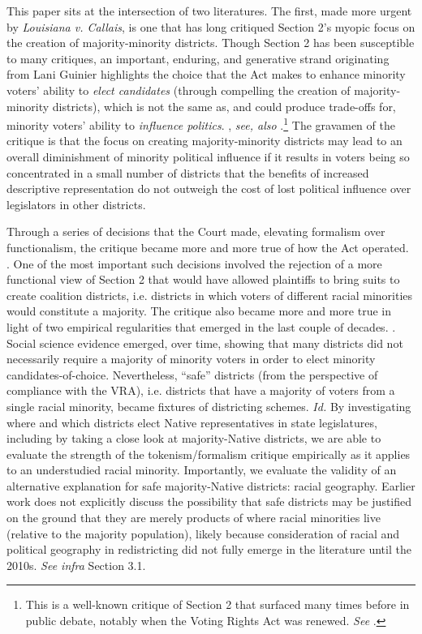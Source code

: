 \documentclass[12pt]{article}
\begin{document}
This paper sits at the intersection of two literatures.  The first, made more urgent by \textit{Louisiana v. Callais}, is one that has long critiqued Section 2's myopic focus on the creation of majority-minority districts. Though Section 2 has been susceptible to many critiques, an important, enduring, and generative strand originating from Lani Guinier highlights the choice that the Act makes to enhance minority voters' ability to \emph{elect candidates} (through compelling the creation of majority-minority districts), which is not the same as, and could produce trade-offs for, minority voters' ability to \emph{influence politics}. \cite{guinier1989keeping,guinier1991triumph,guinier1992representation}, \textit{see, also} \cite{abrams1992relationships,issacharoff2015voting}.\footnote{This is a well-known critique of Section 2 that surfaced many times before in public debate, notably when the Voting Rights Act was renewed.  \textit{See} \cite{persily2007promise}.} The gravamen of the critique is that the focus on creating majority-minority districts may lead to an overall diminishment of minority political influence if it results in voters being so concentrated in a small number of districts that the benefits of increased descriptive representation do not outweigh the cost of lost political influence over legislators in other districts.

Through a series of decisions that the Court made, elevating formalism over functionalism, the critique became more and more true of how the Act operated. \cite{karlan1992rights,pildes2001voting}. One of the most important such decisions involved the rejection of a more functional view of Section 2 that would have allowed plaintiffs to bring suits to create coalition districts, i.e. districts in which voters of different racial minorities would constitute a majority. The critique also became more and more true in light of two empirical regularities that emerged in the last couple of decades. \cite{pildes2001voting}. Social science evidence emerged, over time, showing that many districts did not necessarily require a majority of minority voters in order to elect minority candidates-of-choice. Nevertheless, ``safe'' districts (from the perspective of compliance with the VRA), i.e. districts that have a majority of voters from a single racial minority, became fixtures of districting schemes. \textit{Id.} By investigating where and which districts elect Native representatives in state legislatures, including by taking a close look at majority-Native districts, we are able to evaluate the strength of the tokenism/formalism critique empirically as it applies to an understudied racial minority.  Importantly, we evaluate the validity of an alternative explanation for safe majority-Native districts: racial geography.  Earlier work does not explicitly discuss the possibility that safe districts may be justified on the ground that they are merely products of where racial minorities live (relative to the majority population), likely because consideration of racial and political geography in redistricting did not fully emerge in the literature until the 2010s. \textit{See infra} Section 3.1.
\end{document}

